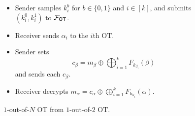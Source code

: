 \begin{figure}[h]
	\begin{mdframed}[
		linecolor=black,
		linewidth=1pt,
		roundcorner=5pt,
		backgroundcolor=white,
		userdefinedwidth=\textwidth,
		]
		\vspace{2mm}
		\begin{itemize}
			\item Sender samples $k_i^{b}$ for $b\in\{0,1\}$ and $i\in[k]$, and submits $(k_i^0, k_i^{1})$ to $\mathcal{F}_\mathsf{OT}$.
			\item Receiver sends $\alpha_i$ to the $i$th OT.
			\item Sender sets
			$$c_\beta = m_\beta\oplus \bigoplus_{i=1}^k F_{k_{\beta_i}}(\beta)$$ and sends each $c_\beta$. 
			\item Receiver decrypts $m_\alpha = c_\alpha\oplus\bigoplus_{i=1}^k F_{k_{\alpha_i}}(\alpha)$.
		\end{itemize}
		\vspace{2mm}
	\end{mdframed}
	\caption{$1$-out-of-$N$ OT from $1$-out-of-$2$ OT.}
	\label{fig:1outofNOT}
\end{figure}